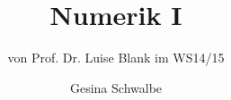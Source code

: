 \documentclass[ngerman,fontsize=11pt, paper=a4, parskip=half, titlepage=true, toc=bib]{scrbook}
\begin{document}
\frontmatter	%
\subject{Vorlesungsmitschrift zur Vorlesung}
\title{Numerik I}
\subtitle{von Prof. Dr. Luise Blank im WS14/15}
\author{Gesina Schwalbe}
\date{}
\maketitle
\tableofcontents


\mainmatter		%





















\nocite{*} %
\backmatter		%


\printindex		%

\printbibliography	%
\end{document}

